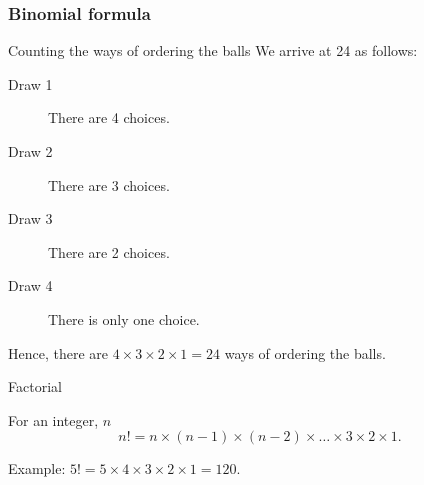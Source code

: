 \documentclass[handout]{beamer}
\begin{document}

   \begin{frame} \frametitle{Binomial formula}

   \begin{block}
   {Counting the ways of ordering the balls}
   We arrive at 24 as follows:
   \begin{description}

   \item[Draw 1] There are 4 choices.

   \item[Draw 2] There are 3 choices.

   \item[Draw 3] There are 2 choices.

   \item[Draw 4] There is only one choice.
   \end{description}

   Hence, there are $4 \times 3 \times 2 \times 1 = 24$ ways
   of ordering the balls.
   \end{block}

   \begin{block}
   {Factorial}

   For an integer, $n$
   $$
   n! = n \times (n-1) \times (n-2) \times \dots \times 3 \times 2 \times 1.
   $$

   Example: $5! = 5 \times 4 \times 3 \times 2 \times 1 = 120$.
   \end{block}
   \end{frame}

\end{document}
